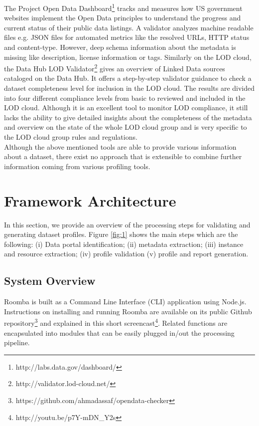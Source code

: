 \documentclass{sig-alternate}
\begin{document}
The Project Open Data Dashboard\footnote{http://labs.data.gov/dashboard/} tracks and measures how US government websites implement the Open Data principles to understand the progress and current status of their public data listings. A validator analyzes machine readable files e.g. JSON files for automated metrics like the resolved URLs, HTTP status and content-type. However, deep schema information about the metadata is missing like description, license information or tags. Similarly on the LOD cloud, the Data Hub LOD Validator\footnote{http://validator.lod-cloud.net/} gives an overview of Linked Data sources cataloged on the Data Hub. It offers a step-by-step validator guidance to check a dataset completeness level for inclusion in the LOD cloud. The results are divided into four different compliance levels from basic to reviewed and included in the LOD cloud. Although it is an excellent tool to monitor LOD compliance, it still lacks the ability to give detailed insights about the completeness of the metadata and overview on the state of the whole LOD cloud group and is very specific to the LOD cloud group rules and regulations.\\
Although the above mentioned tools are able to provide various information about a dataset, there exist no approach that is extensible to combine further information coming from various profiling tools.

\section{Framework Architecture}

In this section, we provide an overview of the processing steps for validating and generating dataset profiles. Figure \ref{fig:1} shows the main steps which are the following: (i) Data portal identification; (ii) metadata extraction; (iii) instance and resource extraction; (iv) profile validation (v) profile and report generation.

\subsection{System Overview}

Roomba is built as a Command Line Interface (CLI) application using Node.js. Instructions on installing and running Roomba are available on its public Github repository\footnote{https://github.com/ahmadassaf/opendata-checker} and explained in this short screencast\footnote{http://youtu.be/p7Y-mDN\_Y2s}. Related functions are encapsulated into modules that can be easily plugged in/out the processing pipeline.
\end{document}
